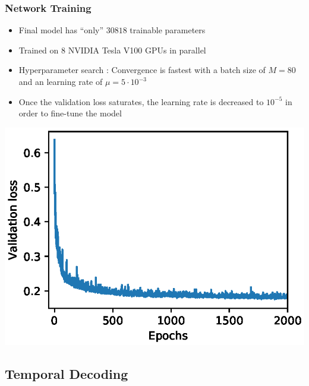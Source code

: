\documentclass{beamer}
\begin{document}
\begin{frame}
\frametitle{Network Training}
\begin{itemize}
\item Final model has ``only'' $\num[group-separator={,}]{30818}$ trainable parameters
\item Trained on 8 NVIDIA Tesla V100 GPUs in parallel
\item Hyperparameter search \cite{nevergrad}: Convergence is fastest with a batch size of $M = 80$ and an learning rate of $\mu = 5 \cdot10^{-3}$
\item Once the validation loss saturates, the learning rate is decreased to $10^{-5}$ in order to fine-tune the model
\end{itemize}
\begin{minipage}{\textwidth} 
\centering
\includegraphics[scale=0.55]{figures/validation_loss.eps}
\end{minipage}
\end{frame}


\subsection{Temporal Decoding}
\end{document}
